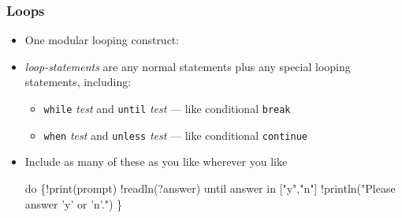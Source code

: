 \documentclass[12pt]{beamer}
\begin{document}
\begin{frame}[fragile]
\frametitle{Loops}
\begin{itemize}
\item One modular looping construct: \\[-1ex]
  \begin{minipage}{0.95\linewidth}
    \begin{block}{}
\begin{semiverbatim}
    do \{}
        \emph{loop-statements} \ldots
    \}
\end{semiverbatim}
    \end{block}
  \end{minipage}
\item \emph{loop-statements} are any normal statements plus any
  special looping statements, including:
  \begin{itemize}
  \item \alert{\texttt{while} \emph{test}} and
    \alert{\texttt{until} \emph{test}}
    --- like conditional \texttt{break}
  \item \alert{\texttt{when} \emph{test}} and
    \alert{\texttt{unless} \emph{test}}
  --- like conditional \texttt{continue}
  \end{itemize}
\item Include as many of these as you like wherever you like \\[-1ex]
  \begin{minipage}{0.95\linewidth}
    \begin{block}{}
\begin{semiverbatim}
    do \{!print(prompt)
        !readln(?answer)
        until answer in ["y","n"]
        !println("Please answer 'y' or 'n'.")
    \}
\end{semiverbatim}
    \end{block}
  \end{minipage}
\end{itemize}
\end{frame}
\end{document}
